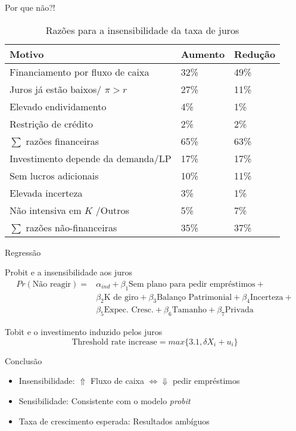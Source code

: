 \documentclass[presentation]{beamer}
\begin{document}
\begin{frame}[label={sec:orgbc3edf6}]{Por que não?!}
\begin{table}[htbp]
\caption{Razões para a insensibilidade da taxa de juros}
\centering
\begin{tabular}{lll}
\hline
Motivo & Aumento & Redução\\
\hline
Financiamento por fluxo de caixa & 32\% & 49\%\\
Juros já estão baixos/ \(\pi > r\) & 27\% & 11\%\\
Elevado endividamento & 4\% & 1\%\\
Restrição de crédito & 2\% & 2\%\\
\hline
\(\sum\) razões financeiras & 65\% & 63\%\\
\hline
Investimento depende da demanda/LP & 17\% & 17\%\\
Sem lucros adicionais & 10\% & 11\%\\
Elevada incerteza & 3\% & 1\%\\
Não intensiva em \(K\) /Outros & 5\% & 7\%\\
\hline
\(\sum\) razões não-financeiras & 35\% & 37\%\\
\hline
\end{tabular}
\end{table}
\end{frame}
\begin{frame}[label={sec:orgb6e7a2c}]{Regressão}
\begin{block}{Probit e a insensibilidade aos juros}
\begin{align*}
Pr(\text{Não reagir}) =& \alpha_{ind} + \beta_{1}\text{Sem plano para pedir empréstimos} + \\
& \beta_{2}\text{K de giro} + \beta_{3}\text{Balanço Patrimonial} + \beta_{4}\text{Incerteza} + \\
& \beta_{5}\text{Expec. Cresc.} + \beta_{6}\text{Tamanho} + \beta_{7}\text{Privada}
\end{align*}
\end{block}
\begin{block}{Tobit e o investimento induzido pelos juros}
$$
\text{Threshold rate increase} = max\{3.1, \delta X_{i} + u_{i}\}
$$
\end{block}
\begin{block}{Conclusão}
\begin{itemize}
\item \alert{Insensibilidade:} \(\Uparrow\) Fluxo de caixa \(\Leftrightarrow \Downarrow\) pedir empréstimos
\item \alert{Sensibilidade:} Consistente com o modelo \emph{probit}
\item \alert{Taxa de crescimento esperada:} Resultados ambíguos
\end{itemize}
\end{block}
\end{frame}
\end{document}
